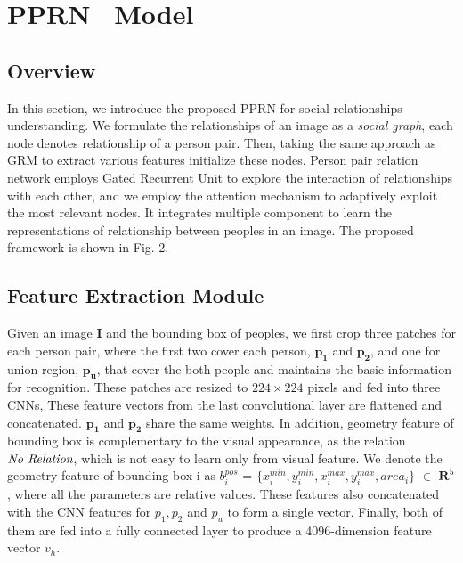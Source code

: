 \documentclass{article}
\newcommand{\PPRN}{{\sf PPRN}}
\begin{document}
\section{PPRN \ Model}

\subsection{Overview} \label{section:ov}
In this section, we introduce the proposed {\PPRN} for social relationships understanding. We formulate the relationships of an image as a \emph{social graph}, each node denotes relationship of a person pair. Then, taking the same approach as GRM\cite{DBLP:conf/ijcai/WangCRYCL18} to extract various features initialize these nodes. Person pair relation  network employs Gated Recurrent Unit\cite{DBLP:conf/ssst/ChoMBB14} to explore the interaction of relationships with each other, and we employ the attention mechanism to adaptively exploit the most relevant nodes. It integrates multiple
component to learn the representations of relationship between peoples in an image.
 The proposed framework is shown in Fig. 2.

\subsection{Feature Extraction Module} \label{section:vs}

Given an image \textbf{I} and the bounding box of peoples, we first crop three patches for each person pair, where the first two cover each person, $\mathbf{p_1}$ and $\mathbf{p_2}$, and one for union region, $\mathbf{p_u}$, that cover the both people and maintains the basic information for recognition. These patches are resized to $224\times224$ pixels and fed into three CNNs, These feature vectors from the last convolutional layer are flattened and concatenated. $\mathbf{p_1}$ and $\mathbf{p_2}$ share the same weights.
In addition, geometry feature of bounding box is complementary to the visual appearance, as the relation $\emph{No Relation}$, which is not easy to learn only from visual feature. We denote the geometry feature of bounding box i as $b_i^{pos}$ = $\{x_i^{min}, y_i^{min},x_i^{max},y_i^{max},area_i\}$  $\in$ $\mathbf{R}^5$, where all the parameters are relative values. These features also concatenated with the CNN features for $p_1,p_2$ and $p_u$ to form a single vector. Finally, both of them are fed into a fully connected layer to produce a 4096-dimension feature vector $v_h$.
\end{document}
